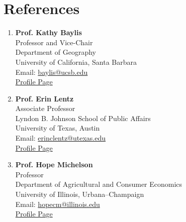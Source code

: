 \documentclass[a4paper,11pt]{article}
\begin{document}
\section{\textbf{References}}
\vspace{-0.4mm}
\small{
\begin{enumerate}[leftmargin=*,labelsep=2mm]

\item \textbf{Prof. Kathy Baylis} \\
Professor and Vice-Chair \\
Department of Geography \\
University of California, Santa Barbara \\
Email: \href{mailto:baylis@ucsb.edu}{baylis@ucsb.edu} \\
\href{https://www.geog.ucsb.edu/people/faculty/kathy-baylis}{Profile Page}

\item \textbf{Prof. Erin Lentz} \\
Associate Professor \\
Lyndon B. Johnson School of Public Affairs \\
University of Texas, Austin \\
Email: \href{mailto:erinclentz@utexas.edu}{erinclentz@utexas.edu}\\
\href{https://lbj.utexas.edu/lentz-erin}{Profile Page} 

\item \textbf{Prof. Hope Michelson} \\
Professor \\
Department of Agricultural and Consumer Economics \\
University of Illinois, Urbana–Champaign \\
Email: \href{mailto:hopecm@illinois.edu}{hopecm@illinois.edu} \\
\href{https://www.hopemichelson.org/}{Profile Page}


\end{enumerate}
}
\end{document}
